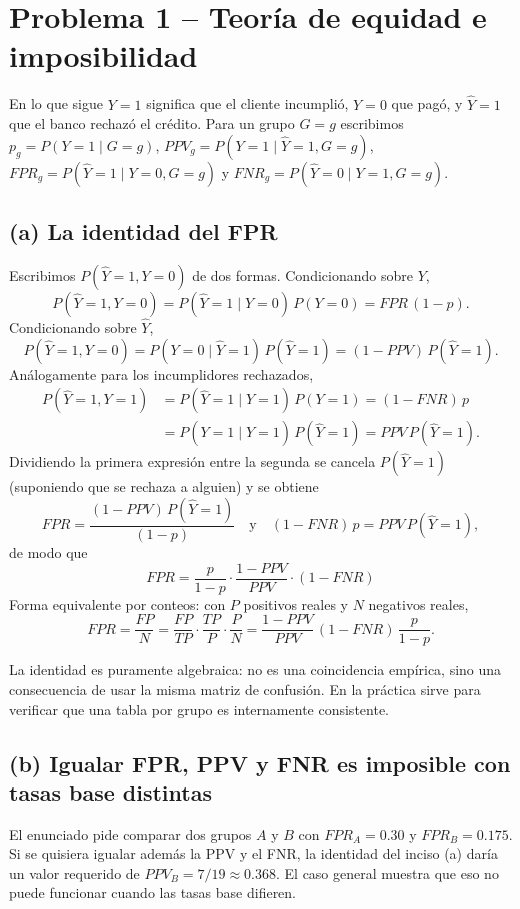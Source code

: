 \section*{Problema 1 -- Teoría de equidad e imposibilidad}

En lo que sigue $Y=1$ significa que el cliente incumplió, $Y=0$ que pagó, y
$\hat{Y}=1$ que el banco rechazó el crédito. Para un grupo $G=g$ escribimos
$p_g=P(Y=1\mid G=g)$, $PPV_g=P(Y=1\mid \hat{Y}=1,G=g)$,
$FPR_g=P(\hat{Y}=1\mid Y=0,G=g)$ y $FNR_g=P(\hat{Y}=0\mid Y=1,G=g)$.

\subsection*{(a) La identidad del FPR}

Escribimos $P(\hat{Y}=1,Y=0)$ de dos formas. Condicionando sobre $Y$,
\[
P(\hat{Y}=1,Y=0)=P(\hat{Y}=1\mid Y=0)\,P(Y=0)=FPR\,(1-p).
\]
Condicionando sobre $\hat{Y}$,
\[
P(\hat{Y}=1,Y=0)=P(Y=0\mid \hat{Y}=1)\,P(\hat{Y}=1)=(1-PPV)\,P(\hat{Y}=1).
\]
Análogamente para los incumplidores rechazados,
\begin{align*}
P(\hat{Y}=1,Y=1)&=P(\hat{Y}=1\mid Y=1)\,P(Y=1)=(1-FNR)\,p\\
&=P(Y=1\mid \hat{Y}=1)\,P(\hat{Y}=1)=PPV\,P(\hat{Y}=1).
\end{align*}
Dividiendo la primera expresión entre la segunda se cancela $P(\hat{Y}=1)$
(suponiendo que se rechaza a alguien) y se obtiene
\[
FPR=\frac{(1-PPV)\,P(\hat{Y}=1)}{(1-p)}
    \quad\text{y}\quad
    (1-FNR)\,p = PPV\,P(\hat{Y}=1),
\]
de modo que
\[
\;FPR=\frac{p}{1-p}\cdot\frac{1-PPV}{PPV}\cdot(1-FNR)\;
\]
Forma equivalente por conteos: con $P$ positivos reales y $N$ negativos reales,
\[
FPR=\frac{FP}{N}=\frac{FP}{TP}\cdot\frac{TP}{P}\cdot\frac{P}{N}
   =\frac{1-PPV}{PPV}\,(1-FNR)\,\frac{p}{1-p}.
\]

La identidad es puramente algebraica: no es una coincidencia empírica, sino
una consecuencia de usar la misma matriz de confusión. En la práctica sirve
para verificar que una tabla por grupo es internamente consistente.

\subsection*{(b) Igualar FPR, PPV y FNR es imposible con tasas base distintas}

El enunciado pide comparar dos grupos $A$ y $B$ con $FPR_A=0.30$ y
$FPR_B=0.175$. Si se quisiera igualar además la PPV y el FNR, la identidad del
inciso (a) daría un valor requerido de $PPV_B=7/19\approx 0.368$. El caso
general muestra que eso no puede funcionar cuando las tasas base difieren.

